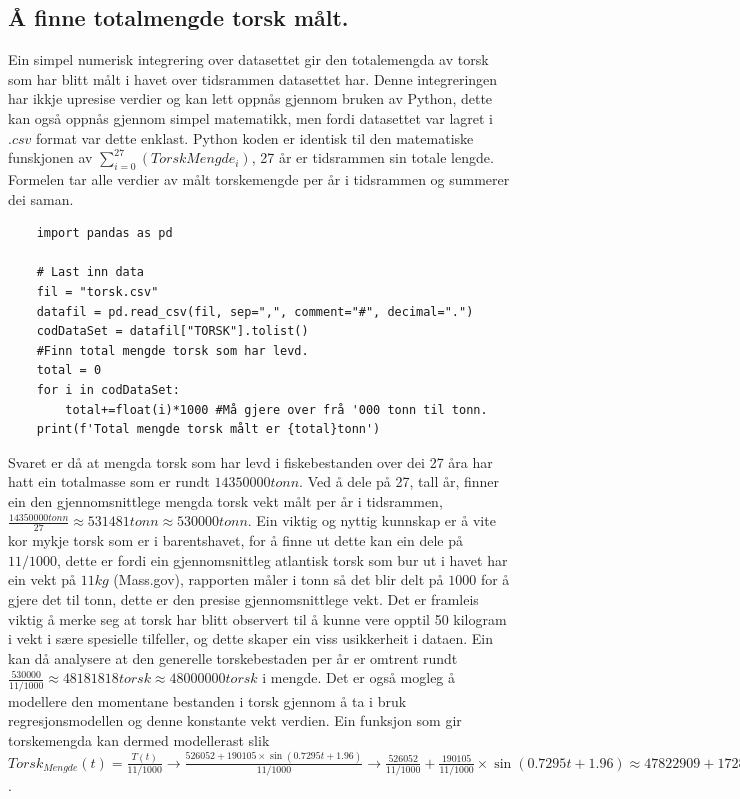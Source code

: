 \documentclass{report}
\begin{document}
\subsection{Å finne totalmengde torsk målt.}
Ein simpel numerisk integrering over datasettet gir den totalemengda av torsk som har blitt målt i havet over tidsrammen datasettet har.
Denne integreringen har ikkje upresise verdier og kan lett oppnås gjennom bruken av Python, dette kan også oppnås gjennom simpel matematikk, men fordi datasettet var lagret i $.csv$ format var dette enklast.
Python koden er identisk til den matematiske funskjonen av $\sum _{i=0} ^{27} (TorskMengde_{i})$, 27 år er tidsrammen sin totale lengde. Formelen tar alle verdier av målt torskemengde per år i tidsrammen og summerer dei saman.
\begin{verbatim}
    import pandas as pd

    # Last inn data
    fil = "torsk.csv"
    datafil = pd.read_csv(fil, sep=",", comment="#", decimal=".")
    codDataSet = datafil["TORSK"].tolist()
    #Finn total mengde torsk som har levd.
    total = 0
    for i in codDataSet:
        total+=float(i)*1000 #Må gjere over frå '000 tonn til tonn.
    print(f'Total mengde torsk målt er {total}tonn')
\end{verbatim}
Svaret er då at mengda torsk som har levd i fiskebestanden over dei 27 åra har hatt ein totalmasse som er rundt $14350000tonn$.
Ved å dele på 27, tall år, finner ein den gjennomsnittlege mengda torsk vekt målt per år i tidsrammen, $\frac{14350000tonn}{27}\approx 531481tonn \approx 530000tonn$.
Ein viktig og nyttig kunnskap er å vite kor mykje torsk som er i barentshavet, for å finne ut dette kan ein dele på $11/1000$, dette er fordi ein gjennomsnittleg atlantisk torsk som bur ut i havet har ein vekt på $11kg$ (Mass.gov), rapporten måler i tonn så det blir delt på $1000$ for å gjere det til tonn, dette er den presise gjennomsnittlege vekt.
Det er framleis viktig å merke seg at torsk har blitt observert til å kunne vere opptil 50 kilogram i vekt i sære spesielle tilfeller, og dette skaper ein viss usikkerheit i dataen.
Ein kan då analysere at den generelle torskebestaden per år er omtrent rundt $\frac{530000}{11/1000}\approx 48181818torsk \approx 48000000torsk$ i mengde.
Det er også mogleg å modellere den momentane bestanden i torsk gjennom å ta i bruk regresjonsmodellen og denne konstante vekt verdien. 
Ein funksjon som gir torskemengda kan dermed modellerast slik $Torsk_{Mengde}(t)=\frac{T(t)}{11/1000} \rightarrow\frac{526052+190105\times \sin(0.7295t+1.96)}{11/1000}\rightarrow\frac{526052}{11/1000} + \frac{190105}{11/1000}\times \sin(0.7295t+1.96)\approx 47822909+17282272\times \sin(0.7295t+1.96)$.
\end{document}

